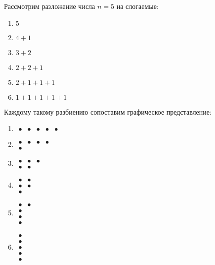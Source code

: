 Рассмотрим разложение числа $n=5$ на слогаемые:
\begin{enumerate}
\item $5$

\item $4+1$

\item $3+2$

\item $2+2+1$

\item $2+1+1+1$

\item $1+1+1+1+1$
\end{enumerate}

Каждому такому разбиению сопоставим графическое представление:
\begin{enumerate}
\item $\begin{matrix}
	\bullet & \bullet & \bullet & \bullet & \bullet
	\end{matrix}$

\item $\begin{matrix}
	\bullet & \bullet & \bullet & \bullet \\
	\bullet
	\end{matrix}$

\item $\begin{matrix}
	\bullet & \bullet & \bullet \\
	\bullet & \bullet
	\end{matrix}$

\item $\begin{matrix}
	\bullet & \bullet \\
	\bullet & \bullet \\
	\bullet
	\end{matrix}$

\item $\begin{matrix}
	\bullet & \bullet \\
	\bullet \\
	\bullet \\
	\bullet
	\end{matrix}$

\item $\begin{matrix}
	\bullet \\
	\bullet \\
	\bullet \\
	\bullet \\
	\bullet
	\end{matrix}$
\end{enumerate}

